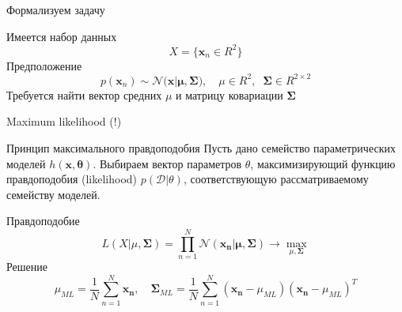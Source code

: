 \documentclass[10pt]{beamer}
\begin{document}
\begin{frame}{Формализуем задачу}

Имеется набор данных
\[
X = \{\mathbf{x}_n \in R^2\}
\]
Предположение
\[
p(\mathbf{x}_n) \sim \mathcal{N(\mathbf{x} | \mathbf{\mu}, \mathbf{\Sigma}}), \quad \mu \in R^2, \;\; \mathbf{\Sigma} \in R^{2 \times 2}
\]
Требуется найти вектор средних $\mu$ и матрицу ковариации $\mathbf{\Sigma}$

\end{frame}

\begin{frame}{Maximum likelihood (!)}

\begin{block}{Принцип максимального правдоподобия}
Пусть дано семейство параметрических моделей $h(\mathbf{x}, \mathbf{\theta})$. Выбираем вектор параметров $\theta$, максимизирующий функцию правдоподобия (likelihood) $p(\mathcal{D} | \theta)$, соответствующую рассматриваемому семейству моделей.
\end{block}

\vspace{1em}
Правдоподобие
\[
L(X | \mu, \mathbf{\Sigma}) = \prod_{n=1}^N \mathcal{N}(\mathbf{x_n} | \mathbf{\mu}, \mathbf{\Sigma}) \rightarrow \max_{\mu, \mathbf{\Sigma}}
\]
Решение
\[
\mu_{ML} = \frac 1 N \sum_{n=1}^N \mathbf{x_n}, \quad \mathbf{\Sigma}_{ML} = \frac 1 N \sum_{n=1}^N (\mathbf{x_n} - \mu_{ML}) (\mathbf{x_n} - \mu_{ML})^T
\]

\end{frame}
\end{document}
